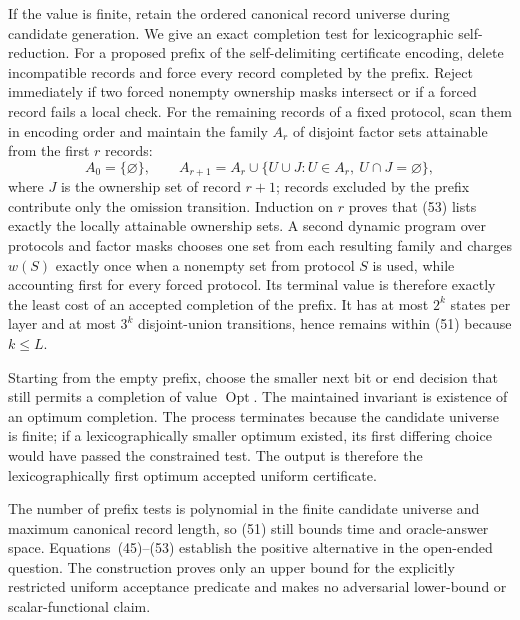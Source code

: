 If the value is finite, retain the ordered canonical record universe during candidate generation.  We give an exact completion test for lexicographic self-reduction.  For a proposed prefix of the self-delimiting certificate encoding, delete incompatible records and force every record completed by the prefix.  Reject immediately if two forced nonempty ownership masks intersect or if a forced record fails a local check.  For the remaining records of a fixed protocol, scan them in encoding order and maintain the family \(A_r\) of disjoint factor sets attainable from the first \(r\) records:
\[
 A_0=\{\varnothing\},\qquad
 A_{r+1}=A_r\cup
 \{U\cup J:U\in A_r,\ U\cap J=\varnothing\},
 \tag{53}
\]
where \(J\) is the ownership set of record \(r+1\); records excluded by the prefix contribute only the omission transition.  Induction on \(r\) proves that (53) lists exactly the locally attainable ownership sets.  A second dynamic program over protocols and factor masks chooses one set from each resulting family and charges \(w(S)\) exactly once when a nonempty set from protocol \(S\) is used, while accounting first for every forced protocol.  Its terminal value is therefore exactly the least cost of an accepted completion of the prefix.  It has at most \(2^k\) states per layer and at most \(3^k\) disjoint-union transitions, hence remains within (51) because \(k\leq L\).

Starting from the empty prefix, choose the smaller next bit or end decision that still permits a completion of value \(\operatorname{Opt}\).  The maintained invariant is existence of an optimum completion.  The process terminates because the candidate universe is finite; if a lexicographically smaller optimum existed, its first differing choice would have passed the constrained test.  The output is therefore the lexicographically first optimum accepted uniform certificate.

The number of prefix tests is polynomial in the finite candidate universe and maximum canonical record length, so (51) still bounds time and oracle-answer space.  Equations~(45)--(53) establish the positive alternative in the open-ended question.  The construction proves only an upper bound for the explicitly restricted uniform acceptance predicate and makes no adversarial lower-bound or scalar-functional claim.
